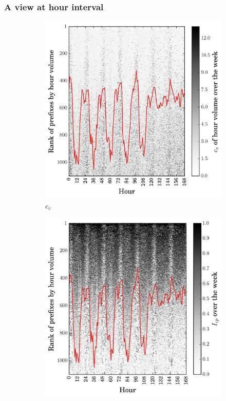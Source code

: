 \subsubsection{A view at hour interval}
\begin{figure}
\centering
        \begin{subfigure}[b]{0.85\textwidth}
                \includegraphics[width=\textwidth]{gfx/chap2/cv_mat_sa.png}
                \caption{$c_v$}
                \label{fig:cv_mat_sa}
        \end{subfigure}
        \begin{subfigure}[b]{0.85\textwidth}
                \includegraphics[width=\textwidth]{gfx/chap2/cp_mat_sa.png}

\end{subfigure}
\end{figure}
